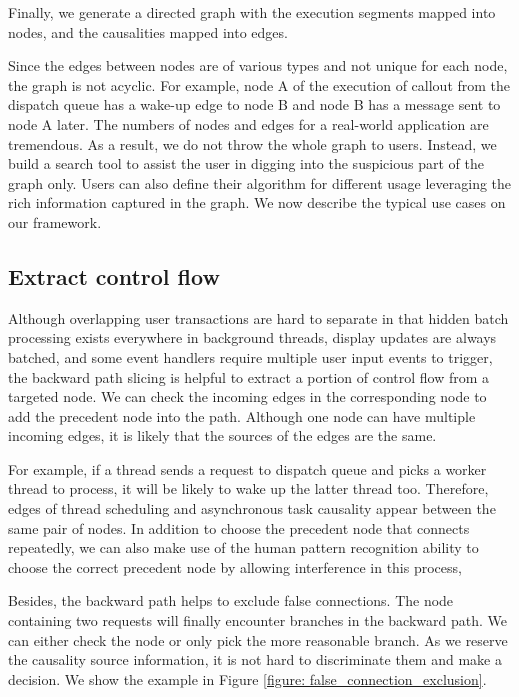 Finally, we generate a directed graph with the execution segments mapped into nodes, and the causalities mapped into edges.

Since the edges between nodes are of various types and not unique for each node, the graph is not acyclic.
For example, node A of the execution of callout from the dispatch queue has a wake-up edge to node B and node B has a message sent to node A later.
The numbers of nodes and edges for a real-world application are tremendous.
As a result, we do not throw the whole graph to users.
Instead, we build a search tool to assist the user in digging into the suspicious part of the graph only.                Users can also define their algorithm for different usage leveraging the rich information captured in the graph. 
We now describe the typical use cases on our framework.

\subsection{Extract control flow}
Although overlapping user transactions are hard to separate in that hidden batch processing exists everywhere in background threads, display updates are always batched, and some event handlers require multiple user input events to trigger, the backward path slicing is helpful to extract a portion of control flow from a targeted node.
We can check the incoming edges in the corresponding node to add the precedent node into the path. 
Although one node can have multiple incoming edges,  it is likely that the sources of the edges are the same.

For example, if a thread sends a request to dispatch queue and picks a worker thread to process, it will be likely to wake up the latter thread too.
Therefore, edges of thread scheduling and asynchronous task causality appear between the same pair of nodes. 
In addition to choose the precedent node that connects repeatedly, we can also make use of the human pattern recognition ability to choose the correct precedent node by allowing interference in this process,

Besides, the backward path helps to exclude false connections.
The node containing two requests will finally encounter branches in the backward path.
We can either check the node or only pick the more reasonable branch.                                   
As we reserve the causality source information, it is not hard to discriminate them and make a decision.
We show the example in Figure \ref{figure: false_connection_exclusion}.                                                  
                                                                                                                         
